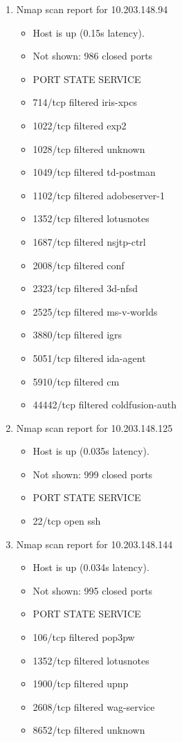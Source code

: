 \documentclass[12pt]{article}
\begin{document}
\begin{enumerate}
\item Nmap scan report for 10.203.148.94
\begin{itemize}\item 
Host is up (0.15s latency).\item 
Not shown: 986 closed ports\item 
PORT      STATE    SERVICE\item 
714/tcp   filtered iris-xpcs\item 
1022/tcp  filtered exp2\item 
1028/tcp  filtered unknown\item 
1049/tcp  filtered td-postman\item 
1102/tcp  filtered adobeserver-1\item 
1352/tcp  filtered lotusnotes\item 
1687/tcp  filtered nsjtp-ctrl\item 
2008/tcp  filtered conf\item 
2323/tcp  filtered 3d-nfsd\item 
2525/tcp  filtered ms-v-worlds\item 
3880/tcp  filtered igrs\item 
5051/tcp  filtered ida-agent\item 
5910/tcp  filtered cm\item 
44442/tcp filtered coldfusion-auth
\end{itemize}

\item Nmap scan report for 10.203.148.125
\begin{itemize}\item 
Host is up (0.035s latency).\item 
Not shown: 999 closed ports\item 
PORT   STATE SERVICE\item 
22/tcp open  ssh
\end{itemize}

\item Nmap scan report for 10.203.148.144
\begin{itemize}\item 
Host is up (0.034s latency).\item 
Not shown: 995 closed ports\item 
PORT     STATE    SERVICE\item 
106/tcp  filtered pop3pw\item 
1352/tcp filtered lotusnotes\item 
1900/tcp filtered upnp\item 
2608/tcp filtered wag-service\item 
8652/tcp filtered unknown
\end{itemize}


\end{enumerate}
\end{document}
